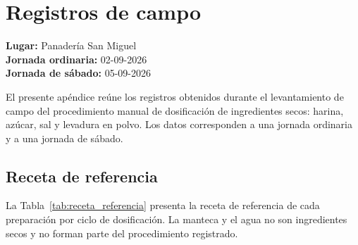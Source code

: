 
\chapter{Registros de campo}
\label{ap:registros_campo}

\normalsize

\noindent
\textbf{Lugar:} Panadería San Miguel\\
\textbf{Jornada ordinaria:} 02-09-2026\\
\textbf{Jornada de sábado:} 05-09-2026

\vspace{0.5cm}

El presente apéndice reúne los registros obtenidos durante el
levantamiento de campo del procedimiento manual de dosificación de
ingredientes secos: harina, azúcar, sal y levadura en polvo. Los datos
corresponden a una jornada ordinaria y a una jornada de sábado.


\section{Receta de referencia}

La Tabla~\ref{tab:receta_referencia} presenta la receta de referencia de
cada preparación por ciclo de dosificación. La manteca y el
agua no son ingredientes secos y no forman parte del procedimiento
registrado.

